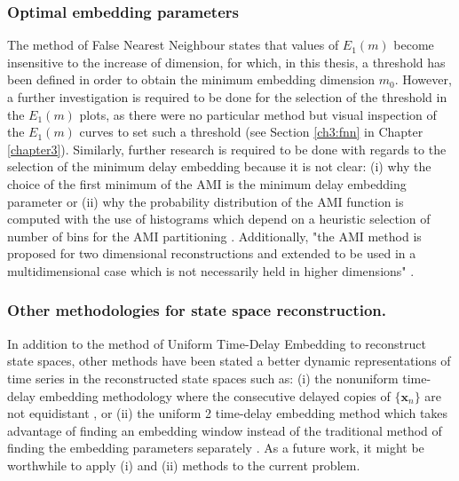 \subsubsection*{Optimal embedding parameters}
The method of False Nearest Neighbour \citep{Cao1997} states that 
values of $E_1(m)$ become insensitive to the increase of dimension, 
for which, in this thesis, a threshold has been defined in 
order to obtain the minimum embedding dimension $m_0$. 
However, a further investigation is required to be done for the 
selection of the threshold in the $E_1(m)$ plots, 
as there were no particular method 
but visual inspection of the $E_1(m)$ curves to set such a threshold 
(see Section \ref{ch3:fnn} in Chapter \ref{chapter3}).
Similarly, further research is required to be done with regards to the 
selection of the minimum delay embedding because it is not clear:
(i) why the choice of the first minimum of the AMI is the minimum delay 
embedding parameter \citep{kantz2003} or 
(ii) why the probability distribution of the AMI function 
is computed with the use of histograms which depend on a heuristic 
selection of number of bins for the AMI partitioning \citep{garcia2005e71}.
Additionally, "the AMI method is proposed for two dimensional 
reconstructions and extended to be used in a multidimensional case 
which is not necessarily held in higher dimensions" 
\citep[p. 156]{gomezgarcia2014}.

\subsubsection*{Other methodologies for state space reconstruction.}
In addition to the method of Uniform Time-Delay Embedding to reconstruct
state spaces, other methods have been stated a better dynamic 
representations of time series in the reconstructed state spaces such as: 
(i) the nonuniform time-delay embedding methodology  
where the consecutive delayed copies of $\{ \boldsymbol{x}_n  \} $ are not
equidistant
\citep{pecora2007, uzal2011, 
Quintana-Duque2012, Quintana-Duque2013, Quintana-Duque2016}, or 
(ii) the uniform 2 time-delay embedding method which takes advantage 
of finding an embedding window instead of the traditional method 
of finding the embedding parameters separately \citep{gomezgarcia2014}.
As a future work, it might be worthwhile to apply (i) and (ii) 
methods to the current problem. 

